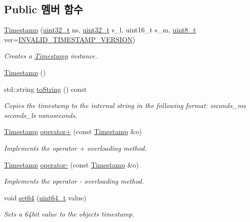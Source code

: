 \subsection*{Public 멤버 함수}
\begin{DoxyCompactItemize}
\item 
\hyperlink{class_timestamp_ad7c124bbfdedbc17815c70cd0563a5c4}{Timestamp} (\hyperlink{parse_8c_a6eb1e68cc391dd753bc8ce896dbb8315}{uint32\+\_\+t} ns, \hyperlink{parse_8c_a6eb1e68cc391dd753bc8ce896dbb8315}{uint32\+\_\+t} s\+\_\+l, uint16\+\_\+t s\+\_\+m, \hyperlink{stdint_8h_aba7bc1797add20fe3efdf37ced1182c5}{uint8\+\_\+t} ver=\hyperlink{ieee1588_8hpp_af9fafbd7c14e721b2aae7fa09ae0a70a}{I\+N\+V\+A\+L\+I\+D\+\_\+\+T\+I\+M\+E\+S\+T\+A\+M\+P\+\_\+\+V\+E\+R\+S\+I\+ON})
\begin{DoxyCompactList}\small\item\em Creates a \hyperlink{class_timestamp}{Timestamp} instance. \end{DoxyCompactList}\item 
\hyperlink{class_timestamp_a3ccb273b45fb16b1b14de8a4c8b44e3b}{Timestamp} ()
\item 
std\+::string \hyperlink{class_timestamp_a3f23c97b6c9f2a88e1121d1c633ccafa}{to\+String} () const 
\begin{DoxyCompactList}\small\item\em Copies the timestamp to the internal string in the following format\+: seconds\+\_\+ms seconds\+\_\+ls nanoseconds. \end{DoxyCompactList}\item 
\hyperlink{class_timestamp}{Timestamp} \hyperlink{class_timestamp_a518b3810734c1b27a0d0620303d9221f}{operator+} (const \hyperlink{class_timestamp}{Timestamp} \&o)
\begin{DoxyCompactList}\small\item\em Implements the operator \textquotesingle{}+\textquotesingle{} overloading method. \end{DoxyCompactList}\item 
\hyperlink{class_timestamp}{Timestamp} \hyperlink{class_timestamp_a5bcc930d6c5b3e0da04fffea7c5477bd}{operator-\/} (const \hyperlink{class_timestamp}{Timestamp} \&o)
\begin{DoxyCompactList}\small\item\em Implements the operator \textquotesingle{}-\/\textquotesingle{} overloading method. \end{DoxyCompactList}\item 
void \hyperlink{class_timestamp_aa62b073d8565fc6536122e8c27351f5c}{set64} (\hyperlink{parse_8c_aec6fcb673ff035718c238c8c9d544c47}{uint64\+\_\+t} value)
\begin{DoxyCompactList}\small\item\em Sets a 64bit value to the object\textquotesingle{}s timestamp. \end{DoxyCompactList}\end{DoxyCompactItemize}
